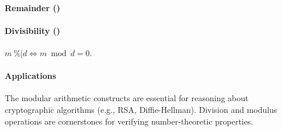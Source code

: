 \paragraph{Remainder (\easycryptinline{\%\%})}
\paragraph{Divisibility (\easycryptinline{\%|})} $m\ \texttt{\%|} d\iff m\bmod d=0$.
\paragraph{Applications} The modular arithmetic constructs are essential for reasoning about cryptographic algorithms (e.g., RSA, Diffie-Hellman).
Division and modulus operations are cornerstones for verifying number-theoretic properties.
\newpage
{}
%	
%	
%	

